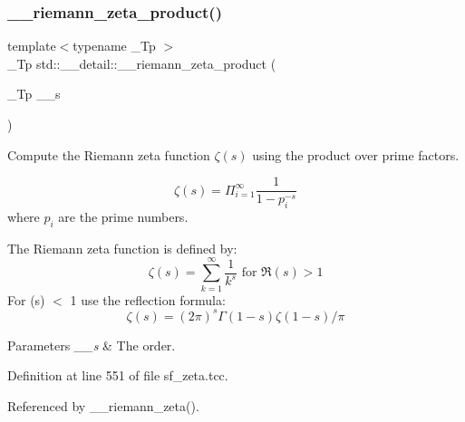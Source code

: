 \mbox{\label{namespacestd_1_1____detail_a917935f42a21af90b78a19ea81349129}} 
\subsubsection{\texorpdfstring{\+\_\+\+\_\+riemann\+\_\+zeta\+\_\+product()}{\_\_riemann\_zeta\_product()}}
{\footnotesize\ttfamily template$<$typename \+\_\+\+Tp $>$ \\
\+\_\+\+Tp std\+::\+\_\+\+\_\+detail\+::\+\_\+\+\_\+riemann\+\_\+zeta\+\_\+product (\begin{DoxyParamCaption}\item[{\+\_\+\+Tp}]{\+\_\+\+\_\+s }\end{DoxyParamCaption})}



Compute the Riemann zeta function $ \zeta(s) $ using the product over prime factors. 

\[ \zeta(s) = \Pi_{i=1}^\infty \frac{1}{1 - p_i^{-s}} \] where $ {p_i} $ are the prime numbers.

The Riemann zeta function is defined by\+: \[ \zeta(s) = \sum_{k=1}^{\infty} \frac{1}{k^{s}} \mbox{ for } \Re(s) > 1 \] For (s) $<$ 1 use the reflection formula\+: \[ \zeta(s) = (2\pi)^s \Gamma(1-s) \zeta(1-s) / \pi \]


\begin{DoxyParams}{Parameters}
{\em \+\_\+\+\_\+s} & The order. \\
\hline
\end{DoxyParams}


Definition at line 551 of file sf\+\_\+zeta.\+tcc.



Referenced by \+\_\+\+\_\+riemann\+\_\+zeta().

\mbox{\label{namespacestd_1_1____detail_a417dc216465f02bb7ef055fa0e4e1f0b}} 
